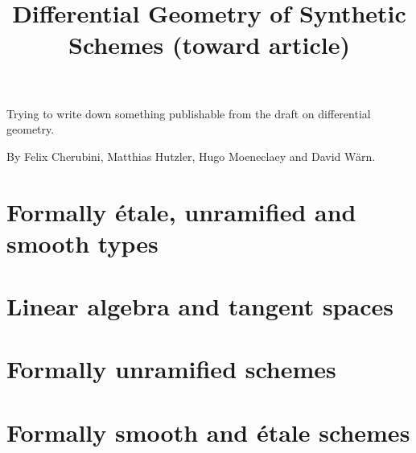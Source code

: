 \documentclass{../util/zariski}
\title{Differential Geometry of Synthetic Schemes (toward article)}
\begin{document}
\maketitle

Trying to write down something publishable from the draft on differential geometry.

By Felix Cherubini, Matthias Hutzler, Hugo Moeneclaey and David Wärn.


\tableofcontents

\section{Formally étale, unramified and smooth types}


\section{Linear algebra and tangent spaces}


\section{Formally unramified schemes}


\section{Formally smooth and étale schemes}



\printindex

\printbibliography
\end{document}
